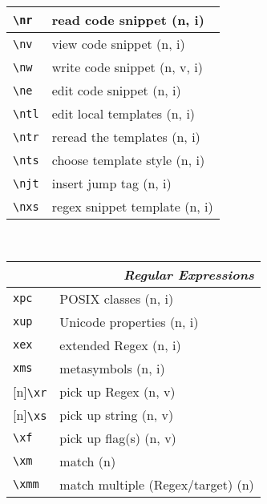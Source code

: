 \documentclass[oneside,10pt,landscape,DIV17]{scrartcl}
\newcommand{\Rep}{{\scriptsize{[n]}}}
\begin{document}
\begin{multicols}{3}
\begin{center}
\begin{tabular}[]{|p{11mm}|p{60mm}|}
\hline \verb'\nr'  & read code snippet         \hfill (n, i)   \\
\hline \verb'\nv'  & view code snippet         \hfill (n, i)   \\
\hline \verb'\nw'  & write code snippet        \hfill (n, v, i)\\
\hline \verb'\ne'  & edit code snippet         \hfill (n, i)   \\
%
\hline \verb'\ntl' & edit local templates      \hfill (n, i)\\
\hline \verb'\ntr' & reread the templates      \hfill (n, i)\\
\hline \verb'\nts' & choose template style     \hfill (n, i)\\
%
\hline \verb'\njt' & insert jump tag           \hfill (n, i)\\
\hline \verb'\nxs' & regex snippet template    \hfill (n, i)\\
\hline
\end{tabular}\\
%
%
\begin{tabular}[]{|p{11mm}|p{60mm}|}
\hline
\multicolumn{2}{|r|}{\textsl{Regular E\textbf{x}pressions}}     \\[1.0ex]
\hline     \verb'xpc' &  POSIX classes                 \hfill (n, i)\\ 
\hline     \verb'xup' &  Unicode properties            \hfill (n, i)\\ 
\hline     \verb'xex' &  extended Regex                \hfill (n, i)\\ 
\hline     \verb'xms' &  metasymbols                   \hfill (n, i)\\ 
%
\hline \Rep\verb'\xr' &  pick up Regex                 \hfill (n, v)\\
\hline \Rep\verb'\xs' &  pick up string                \hfill (n, v)\\
\hline     \verb'\xf' &  pick up flag(s)               \hfill (n, v)\\
\hline     \verb'\xm' &  match                         \hfill (n)   \\
\hline     \verb'\xmm'&  match multiple (Regex/target) \hfill (n)   \\

\end{tabular}
\end{center}
\end{multicols}
\end{document}
